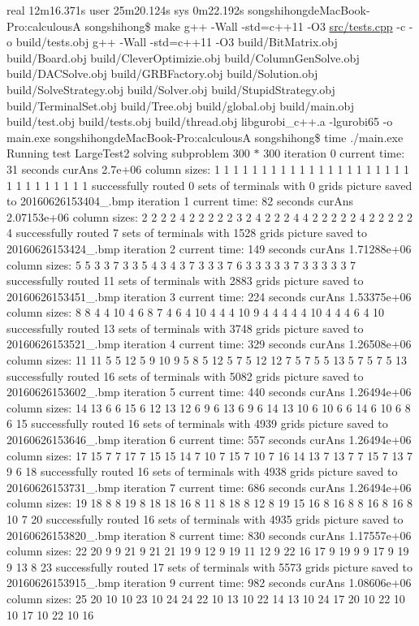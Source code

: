 real 12m16.\+371s user 25m20.\+124s sys 0m22.\+192s songshihongde\+Mac\+Book-\/\+Pro\+:calculousA songshihong\$ make g++ -\/\+Wall -\/std=c++11 -\/\+O3 \hyperlink{tests_8cpp}{src/tests.\+cpp} -\/c -\/o build/tests.\+obj g++ -\/\+Wall -\/std=c++11 -\/\+O3 build/\+Bit\+Matrix.\+obj build/\+Board.\+obj build/\+Clever\+Optimizie.\+obj build/\+Column\+Gen\+Solve.\+obj build/\+D\+A\+C\+Solve.\+obj build/\+G\+R\+B\+Factory.\+obj build/\+Solution.\+obj build/\+Solve\+Strategy.\+obj build/\+Solver.\+obj build/\+Stupid\+Strategy.\+obj build/\+Terminal\+Set.\+obj build/\+Tree.\+obj build/global.\+obj build/main.\+obj build/test.\+obj build/tests.\+obj build/thread.\+obj libgurobi\+\_\+c++.a -\/lgurobi65 -\/o main.\+exe songshihongde\+Mac\+Book-\/\+Pro\+:calculousA songshihong\$ time ./main.exe Running test Large\+Test2 solving subproblem 300 $\ast$ 300 iteration 0 current time\+: 31 seconds cur\+Ans 2.\+7e+06 column sizes\+: 1 1 1 1 1 1 1 1 1 1 1 1 1 1 1 1 1 1 1 1 1 1 1 1 1 1 1 1 1 1 successfully routed 0 sets of terminals with 0 grids picture saved to 20160626153404\+\_.\+bmp iteration 1 current time\+: 82 seconds cur\+Ans 2.\+07153e+06 column sizes\+: 2 2 2 2 4 2 2 2 2 2 3 2 4 2 2 2 4 4 2 2 2 2 2 4 2 2 2 2 2 4 successfully routed 7 sets of terminals with 1528 grids picture saved to 20160626153424\+\_.\+bmp iteration 2 current time\+: 149 seconds cur\+Ans 1.\+71288e+06 column sizes\+: 5 5 3 3 7 3 3 5 4 3 4 3 7 3 3 3 7 6 3 3 3 3 3 7 3 3 3 3 3 7 successfully routed 11 sets of terminals with 2883 grids picture saved to 20160626153451\+\_.\+bmp iteration 3 current time\+: 224 seconds cur\+Ans 1.\+53375e+06 column sizes\+: 8 8 4 4 10 4 6 8 7 4 6 4 10 4 4 4 10 9 4 4 4 4 4 10 4 4 4 6 4 10 successfully routed 13 sets of terminals with 3748 grids picture saved to 20160626153521\+\_.\+bmp iteration 4 current time\+: 329 seconds cur\+Ans 1.\+26508e+06 column sizes\+: 11 11 5 5 12 5 9 10 9 5 8 5 12 5 7 5 12 12 7 5 7 5 5 13 5 7 5 7 5 13 successfully routed 16 sets of terminals with 5082 grids picture saved to 20160626153602\+\_.\+bmp iteration 5 current time\+: 440 seconds cur\+Ans 1.\+26494e+06 column sizes\+: 14 13 6 6 15 6 12 13 12 6 9 6 13 6 9 6 14 13 10 6 10 6 6 14 6 10 6 8 6 15 successfully routed 16 sets of terminals with 4939 grids picture saved to 20160626153646\+\_.\+bmp iteration 6 current time\+: 557 seconds cur\+Ans 1.\+26494e+06 column sizes\+: 17 15 7 7 17 7 15 15 14 7 10 7 15 7 10 7 16 14 13 7 13 7 7 15 7 13 7 9 6 18 successfully routed 16 sets of terminals with 4938 grids picture saved to 20160626153731\+\_.\+bmp iteration 7 current time\+: 686 seconds cur\+Ans 1.\+26494e+06 column sizes\+: 19 18 8 8 19 8 18 18 16 8 11 8 18 8 12 8 19 15 16 8 16 8 8 16 8 16 8 10 7 20 successfully routed 16 sets of terminals with 4935 grids picture saved to 20160626153820\+\_.\+bmp iteration 8 current time\+: 830 seconds cur\+Ans 1.\+17557e+06 column sizes\+: 22 20 9 9 21 9 21 21 19 9 12 9 19 11 12 9 22 16 17 9 19 9 9 17 9 19 9 13 8 23 successfully routed 17 sets of terminals with 5573 grids picture saved to 20160626153915\+\_.\+bmp iteration 9 current time\+: 982 seconds cur\+Ans 1.\+08606e+06 column sizes\+: 25 20 10 10 23 10 24 24 22 10 13 10 22 14 13 10 24 17 20 10 22 10 10 17 10 22 10 16 